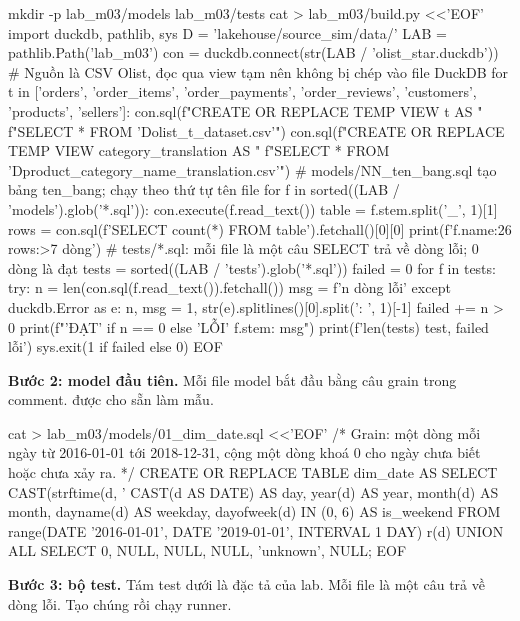 \begin{codeblock}
mkdir -p lab_m03/models lab_m03/tests
cat > lab_m03/build.py <<'EOF'
import duckdb, pathlib, sys
D = 'lakehouse/source_sim/data/'
LAB = pathlib.Path('lab_m03')
con = duckdb.connect(str(LAB / 'olist_star.duckdb'))
# Nguồn là CSV Olist, đọc qua view tạm nên không bị chép vào file DuckDB
for t in ['orders', 'order_items', 'order_payments', 'order_reviews',
          'customers', 'products', 'sellers']:
    con.sql(f"CREATE OR REPLACE TEMP VIEW {t} AS "
            f"SELECT * FROM '{D}olist_{t}_dataset.csv'")
con.sql(f"CREATE OR REPLACE TEMP VIEW category_translation AS "
        f"SELECT * FROM '{D}product_category_name_translation.csv'")
# models/NN_ten_bang.sql tạo bảng ten_bang; chạy theo thứ tự tên file
for f in sorted((LAB / 'models').glob('*.sql')):
    con.execute(f.read_text())
    table = f.stem.split('_', 1)[1]
    rows = con.sql(f'SELECT count(*) FROM {table}').fetchall()[0][0]
    print(f'{f.name:26} {rows:>7} dòng')
# tests/*.sql: mỗi file là một câu SELECT trả về dòng lỗi; 0 dòng là đạt
tests = sorted((LAB / 'tests').glob('*.sql'))
failed = 0
for f in tests:
    try:
        n = len(con.sql(f.read_text()).fetchall())
        msg = f'{n} dòng lỗi'
    except duckdb.Error as e:
        n, msg = 1, str(e).splitlines()[0].split(': ', 1)[-1]
    failed += n > 0
    print(f"{'ĐẠT' if n == 0 else 'LỖI'}  {f.stem}: {msg}")
print(f'{len(tests)} test, {failed} lỗi')
sys.exit(1 if failed else 0)
EOF
\end{codeblock}

\textbf{Bước 2: model đầu tiên.} Mỗi file model bắt đầu bằng câu grain trong comment.  được cho sẵn làm mẫu.

\begin{codeblock}
cat > lab_m03/models/01_dim_date.sql <<'EOF'
/* Grain: một dòng mỗi ngày từ 2016-01-01 tới 2018-12-31,
   cộng một dòng khoá 0 cho ngày chưa biết hoặc chưa xảy ra. */
CREATE OR REPLACE TABLE dim_date AS
SELECT CAST(strftime(d, '%
       CAST(d AS DATE) AS day, year(d) AS year, month(d) AS month,
       dayname(d) AS weekday, dayofweek(d) IN (0, 6) AS is_weekend
FROM range(DATE '2016-01-01', DATE '2019-01-01', INTERVAL 1 DAY) r(d)
UNION ALL
SELECT 0, NULL, NULL, NULL, 'unknown', NULL;
EOF
\end{codeblock}

\textbf{Bước 3: bộ test.} Tám test dưới là đặc tả của lab. Mỗi file là một câu  trả về dòng lỗi. Tạo chúng rồi chạy runner.

